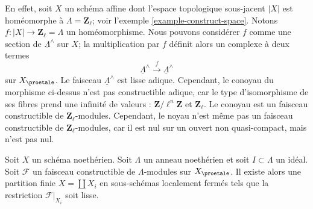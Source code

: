 \medskip\noindent
En effet, soit $X$ un schéma affine dont l'espace topologique sous-jacent $|X|$
est homéomorphe à $\Lambda = \mathbf{Z}_\ell$; voir
l'exemple \ref{example-construct-space}. Notons
$f : |X| \to \mathbf{Z}_\ell = \Lambda$
un homéomorphisme. Nous pouvons considérer $f$ comme une section de
$\underline{\Lambda}^\wedge$ sur $X$; la multiplication par $f$
définit alors un complexe à deux termes
$$
\underline{\Lambda}^\wedge \xrightarrow{f} \underline{\Lambda}^\wedge
$$
sur $X_\proetale$. Le faisceau $\underline{\Lambda}^\wedge$ est lisse adique.
Cependant, le conoyau du morphisme ci-dessus n'est pas constructible adique, car
le type d'isomorphisme de ses fibres prend une infinité
de valeurs : $\mathbf{Z}/\ell^n\mathbf{Z}$ et $\mathbf{Z}_\ell$.
Le conoyau est un faisceau constructible de $\mathbf{Z}_\ell$-modules.
Cependant, le noyau n'est même pas un faisceau constructible de $\mathbf{Z}_\ell$-modules,
car il est nul sur un ouvert non quasi-compact, mais n'est pas nul.

\begin{lemma}
\label{lemma-Noetherian-constructible}
Soit $X$ un schéma noethérien. Soit $\Lambda$ un anneau noethérien et
soit $I \subset \Lambda$ un idéal. Soit $\mathcal{F}$ un
faisceau constructible de $\Lambda$-modules sur $X_\proetale$.
Il existe alors une partition finie $X = \coprod X_i$ en
sous-schémas localement fermés tels que la restriction $\mathcal{F}|_{X_i}$
soit lisse.
\end{lemma}

